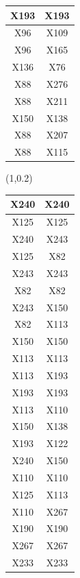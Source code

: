 \documentclass{beamer}
\newcommand{\boz}{\cellcolor{pathwaynode}}
\newcommand{\ghool}{\cellcolor{independentnode}}
\begin{document}
\begin{frame}[plain]
\begin{textblock*}{\paperwidth}
\begin{tabular}{| c c |}
\boz X193   &  \boz X193  \\ \hline
\ghool X96   &  X109  \\ \hline
\ghool X96   &  X165  \\ \hline
\ghool X136   &  X76  \\ \hline
\ghool X88   &  X276  \\ \hline
\ghool X88   &  X211  \\ \hline
\boz X150   &  X138  \\ \hline
\ghool X88   &  X207  \\ \hline
\ghool X88   &  X115  \\ \hline
    \end{tabular}
    \hspace{.5em}
  \end{textblock*}
  \begin{textblock*}{\paperwidth}(1\textwidth,0.2\textheight)
    \raggedright 
    \tiny
    \begin{tabular}{| c c |}
      \hline
\boz X240   &  \boz X240  \\ \hline
\boz X125   &  \boz X125  \\ \hline
\boz X240   &  \boz X243  \\ \hline
\boz X125   &  \boz X82  \\ \hline
\boz X243   &  \boz X243  \\ \hline
\boz X82   &  \boz X82  \\ \hline
\boz X243   &  \boz X150  \\ \hline
\boz X82   &  \boz X113  \\ \hline
\boz X150   &  \boz X150  \\ \hline
\boz X113   &  \boz X113  \\ \hline
\boz X113   &  \boz X193  \\ \hline
\boz X193   &  \boz X193  \\ \hline
\boz X113   &  X110  \\ \hline
\boz X150   &  X138  \\ \hline
\boz X193   &  X122  \\ \hline
\boz X240   &  \boz X150  \\ \hline
X110   &  X110  \\ \hline
\boz X125   &  \boz X113  \\ \hline
X110   &  X267  \\ \hline
\boz X190   &  \boz X190  \\ \hline
X267   &  X267  \\ \hline
X233   &  X233  \\ \hline

\end{tabular}
\end{textblock*}
\end{frame}
\end{document}
